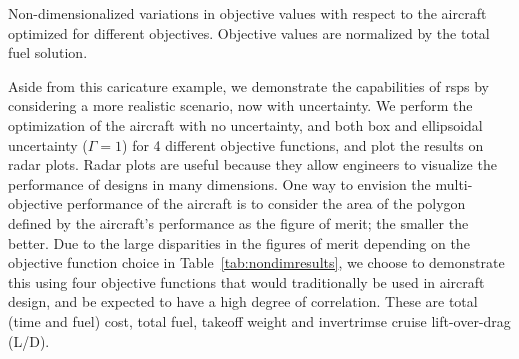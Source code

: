 \begin{table}
\caption{Non-dimensionalized variations in objective values with respect to the aircraft optimized
for different objectives. Objective values are normalized by the total fuel solution.}
    \label{tab:nondimresults}
\end{table}

Aside from this caricature example, we demonstrate the capabilities of \gls{rsp}s
by considering a more realistic scenario, now with uncertainty.
We perform the optimization of the aircraft with no uncertainty, and both box and
ellipsoidal uncertainty ($\Gamma = 1$)
for 4 different objective functions, and plot the results on radar plots.
Radar plots are useful because they allow engineers to visualize the performance
of designs in many dimensions. One way to envision the multi-objective
performance of the aircraft is to consider the area of the polygon defined by the aircraft's
performance as the figure of merit; the smaller the better.
Due to the large disparities in the figures of merit depending on the objective function choice
in Table~\ref{tab:nondimresults}, we choose to demonstrate this using four objective functions
that would traditionally be used in aircraft design, and be expected to have a high degree of correlation.
These are total (time and fuel) cost, total fuel, takeoff weight and invertrimse cruise lift-over-drag (L/D).

